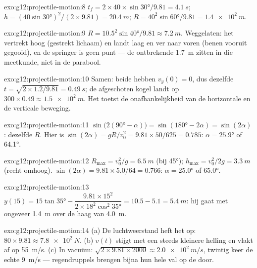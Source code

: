 \begin{solution}{exo:g12:projectile-motion:8}
$t_f = 2 \times 40 \times \sin\ang{30}/9.81 = \qty{4.1}{s}$;
$h = (40\sin\ang{30})^2/(2 \times 9.81) = \qty{20.4}{m}$;
$R = 40^2 \sin\ang{60}/9.81 = \qty{1.4e2}{m}$.
\end{solution}

\begin{solution}{exo:g12:projectile-motion:9}
$R = 10.5^2\sin\ang{40}/9.81 \approx \qty{7.2}{m}$. Weggelaten: het
 vertrekt hoog (gestrekt lichaam) en landt laag en ver naar
voren (benen vooruit gegooid), en de springer is geen punt --- de ontbrekende
\qty{1.7}{m} zitten in die meetkunde, niet in de parabool.
\end{solution}

\begin{solution}{exo:g12:projectile-motion:10}
Samen: beide hebben $v_y(0) = 0$, dus dezelfde
$t = \sqrt{2 \times 1.2/9.81} = \qty{0.49}{s}$; de afgeschoten kogel landt op
$300 \times 0.49 \approx \qty{1.5e2}{m}$. Het toetst de onafhankelijkheid van
de horizontale en de verticale beweging.
\end{solution}

\begin{solution}{exo:g12:projectile-motion:11}
$\sin\bigl(2(\ang{90}-\alpha)\bigr) = \sin(\ang{180}-2\alpha) =
\sin(2\alpha)$: dezelfde $R$. Hier is $\sin(2\alpha) = gR/v_0^2 =
9.81 \times 50/625 = 0.785$: $\alpha = \ang{25.9}$ of \ang{64.1}.
\end{solution}

\begin{solution}{exo:g12:projectile-motion:12}
$R_{\max} = v_0^2/g = \qty{6.5}{m}$ (bij \ang{45});
$h_{\max} = v_0^2/2g = \qty{3.3}{m}$ (recht omhoog).
$\sin(2\alpha) = 9.81 \times 5.0/64 = 0.766$: $\alpha = \ang{25.0}$ of
\ang{65.0}.
\end{solution}

\begin{solution}{exo:g12:projectile-motion:13}
$y(15) = 15\tan\ang{35} - \dfrac{9.81 \times 15^2}
{2 \times 18^2 \cos^2\ang{35}} = 10.5 - 5.1 = \qty{5.4}{m}$: hij gaat met
ongeveer \qty{1.4}{m} over de haag van \qty{4.0}{m}.
\end{solution}

\begin{solution}{exo:g12:projectile-motion:14}
(a) De luchtweerstand heft het  op:
$80 \times 9.81 \approx \qty{7.8e2}{N}$. (b) $v(t)$ stijgt met een steeds
kleinere helling en vlakt af op \qty{55}{m/s}. (c) In vacuüm:
$\sqrt{2 \times 9.81 \times 2000} \approx \qty{2.0e2}{m/s}$, twintig keer de
echte \qty{9}{m/s} --- regendruppels brengen bijna hun hele val op de
 door.
\end{solution}

